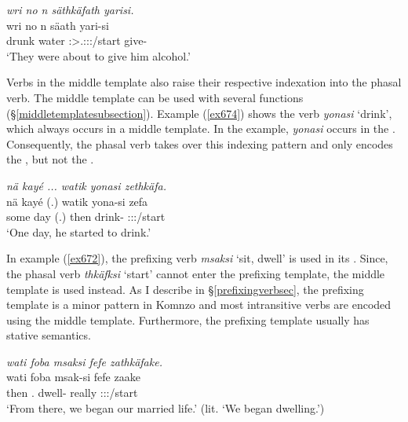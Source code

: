 \begin{exe}
	\ex \emph{wri no n säthkäfath yarisi.}\\
	\gll wri no n säath yari-si\\
	drunk water {\Imn} \Stpl:\Sbj>\Tsg.\Masc:\Io:\Pst:\Pfv/start give-{\Nmlz}\\
	\trans `They were about to give him alcohol.'
	\label{ex671}
\end{exe}

Verbs in the middle template also raise their respective indexation into the phasal verb. The middle template can be used with several functions ({\S}\ref{middletemplatesubsection}). Example (\ref{ex674}) shows the verb \emph{yonasi} `drink', which always occurs in a middle template. In the example, \emph{yonasi} occurs in the . Consequently, the phasal verb takes over this indexing pattern and only encodes the , but not the .

\begin{exe}
	\ex \emph{nä kayé ... watik yonasi zethkäfa.}\\
	\gll nä kayé (.) watik yona-si zefa\\
	some day (.) then drink-{\Nmlz} \Sg:\Sbj:\Pst:\Pfv/start\\
	\trans `One day, he started to drink.'
	\label{ex674}
\end{exe}

In example (\ref{ex672}), the prefixing verb \emph{msaksi} `sit, dwell' is used in its . Since, the phasal verb \emph{thkäfksi} `start' cannot enter the prefixing template, the middle template is used instead. As I describe in {\S}\ref{prefixingverbsec}, the prefixing template is a minor pattern in Komnzo and most intransitive verbs are encoded using the middle template. Furthermore, the prefixing template usually has stative semantics.

\begin{exe}
	\ex \emph{wati foba msaksi fefe zathkäfake.}\\
	\gll wati foba msak-si fefe zaake\\
	then \Dist.{\Abl} dwell-{\Nmlz} really \Fdu:\Sbj:\Pst:\Pfv/start\\
	\trans `From there, we began our married life.' (lit. `We began dwelling.')\\
	\label{ex672}
\end{exe}

